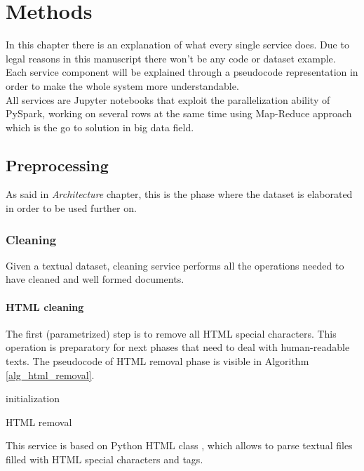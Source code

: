\documentclass[\main/main.tex]{subfiles}
\begin{document}
\chapter{Methods}
\label{methods}
In this chapter there is an explanation of what every single service does. Due to legal reasons in this manuscript there won't be any code or dataset example. Each service component will be explained through a pseudocode representation in order to make the whole system more understandable.\\
All services are Jupyter notebooks that exploit the parallelization ability of PySpark, working on several rows at the same time using Map-Reduce approach which is the go to solution in big data field.
\section{Preprocessing}
As said in \emph{Architecture} chapter, this is the phase where the dataset is elaborated in order to be used further on. 
\subsection{Cleaning}
Given a textual dataset, cleaning service performs all the operations needed to have cleaned and well formed documents.
\subsubsection{HTML cleaning}
The first (parametrized) step is to remove all HTML special characters. This operation is preparatory for next phases that need to deal with human-readable texts. The pseudocode of HTML removal phase is visible in Algorithm \ref{alg_html_removal}.
\begin{center}
    \begin{algorithm}[H]
     initialization
     \caption{HTML removal}
     \label{alg_html_removal}
    \end{algorithm}
\end{center}
This service is based on Python HTML class \cite{html_parser}, which allows to parse textual files filled with HTML special characters and tags.
\end{document}
